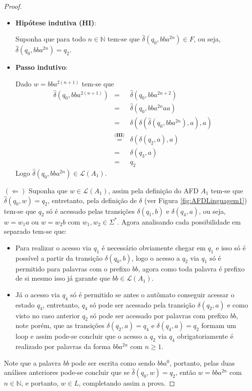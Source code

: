 \begin{exem}
\begin{proof}
\begin{itemize}
			\item \textbf{Hipótese indutiva (HI)}:
			
			Suponha que para todo $n \in \mathbb{N}$ tem-se que $\widehat{\delta}(q_0, bba^{2n}) \in F$, ou seja, $\widehat{\delta}(q_0, bba^{2n}) = q_2$.
			
			\item \textbf{Passo indutivo}:
			
			Dado $w = bba^{2(n+1)}$ tem-se que
			\begin{eqnarray*}
				\widehat{\delta}(q_0, bba^{2(n+1)}) & = & \widehat{\delta}(q_0, bba^{2n + 2})\\
				& = & \widehat{\delta}(q_0, bba^{2n}aa)\\
				& = & \delta(\delta(\widehat{\delta}(q_0, bba^{2n}), a), a)\\
				& \stackrel{\textbf{(HI)}}{=} & \delta(\delta(q_2, a), a)\\
				& = & \delta(q_3, a)\\
				& = & q_2
			\end{eqnarray*} 
			Logo $\widehat{\delta}(q_0, bba^{2n}) \in \mathcal{L}(A_1)$.
		\end{itemize} 
		$(\Leftarrow)$ Suponha que $w \in \mathcal{L}(A_1)$, assim pela definição do AFD $A_1$ tem-se que $\widehat{\delta}(q_0, w) = q_2$, entretanto, pela definição de $\delta$ (ver Figura \ref{fig:AFDLinguagem1}) tem-se que $q_2$ só é acessado pelas transições $\delta(q_1, b)$ e $\delta(q_4, a)$, ou seja, $w = w_1a$ ou $w = w_2b$ com $w_1, w_2 \in \Sigma^*$. Agora analisando cada possibilidade em separado tem-se que: 
		\begin{itemize}
			\item Para realizar o acesso via $q_1$ é necessário obviamente chegar em $q_1$ e isso só é possível a partir da transição $\delta(q_0, b)$, logo o acesso a $q_2$ via $q_1$ só é permitido para palavras com o prefixo $bb$, agora como toda palavra é prefixo de si mesmo isso já garante que $bb \in \mathcal{L}(A_1)$.
			\item Já o acesso via $q_4$ só é permitido se antes o autômato conseguir acessar o estado $q_4$, entretanto, $q_4$ só pode ser acessado pela transição $\delta(q_2, a)$ e como visto no caso anterior $q_2$ só pode ser acessado por palavras com prefixo $bb$, note porém, que as transições $\delta(q_2, a) = q_4$ e $\delta(q_4, a) = q_2$ formam um loop e assim pode-se concluir que o acesso a $q_2$ via $q_4$ obrigatoriamente é realizado por palavras da forma $bba^{2n}$ com $n \geq 1$.
		\end{itemize}
		Note que a palavra $bb$ pode ser escrita como sendo $bba^0$, portanto, pelas duas análises anteriores pode-se concluir que se $\widehat{\delta}(q_0, w) = q_2$, então $w = bba^{2n}$ com $n \in \mathbb{N}$, e portanto, $w \in L$, completando assim a prova. 
	\end{proof}
\end{exem}


